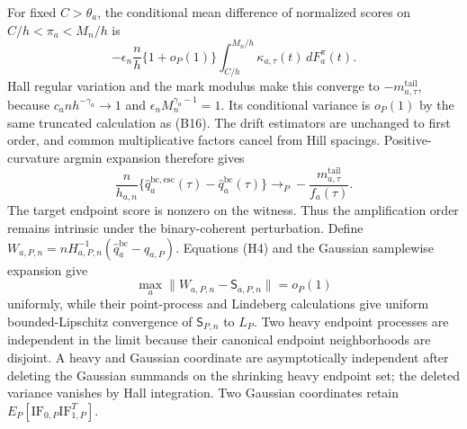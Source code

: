 For fixed \(C>\theta_a\), the conditional mean difference of normalized scores on \(C/h<\pi_a<M_n/h\) is
\[
 -\epsilon_n\frac n h\{1+o_P(1)\}
 \int_{C/h}^{M_n/h}\kappa_{a,\tau}(t)\,dF_a^\pi(t).
\]
Hall regular variation and the mark modulus make this converge to \(-m^{\mathrm{tail}}_{a,\tau}\), because \(c_an h^{-\gamma_a}\to1\) and \(\epsilon_nM_n^{\gamma_a-1}=1\).  Its conditional variance is \(o_P(1)\) by the same truncated calculation as (B16).  The drift estimators are unchanged to first order, and common multiplicative factors cancel from Hill spacings.  Positive-curvature argmin expansion therefore gives
\[
 \frac n{h_{a,n}}\{\widehat q_a^{\mathrm{bc,esc}}(\tau)-\widehat q_a^{\mathrm{bc}}(\tau)\}
 \to_P-\frac{m^{\mathrm{tail}}_{a,\tau}}{f_a(\tau)}.
\]
The target endpoint score is nonzero on the witness.  Thus the amplification order remains intrinsic under the binary-coherent perturbation.
Define \(W_{a,P,n}=nH_{a,P,n}^{-1}(\widehat q_a^{\mathrm{bc}}-q_{a,P})\).  Equations (H4) and the Gaussian samplewise expansion give
\[
 \max_a\|W_{a,P,n}-\mathsf S_{a,P,n}\|=o_P(1)
\tag{Q1}
\]
uniformly, while their point-process and Lindeberg calculations give uniform bounded-Lipschitz convergence of \(\mathsf S_{P,n}\) to \(L_P\).  Two heavy endpoint processes are independent in the limit because their canonical endpoint neighborhoods are disjoint.  A heavy and Gaussian coordinate are asymptotically independent after deleting the Gaussian summands on the shrinking heavy endpoint set; the deleted variance vanishes by Hall integration.  Two Gaussian coordinates retain \(E_P[\mathrm{IF}_{0,P}\mathrm{IF}_{1,P}^T]\).

